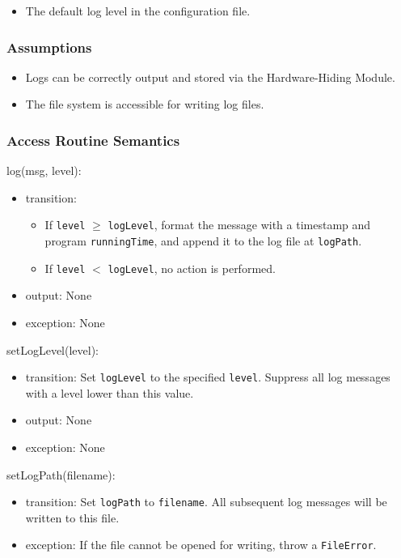 \documentclass[12pt, titlepage]{article}
\begin{document}
\begin{itemize}
\item The default log level in the configuration file.
\end{itemize}

\subsubsection{Assumptions}

\begin{itemize}
\item Logs can be correctly output and stored via the Hardware-Hiding Module.
\item The file system is accessible for writing log files.
\end{itemize}

\subsubsection{Access Routine Semantics}

\noindent log(msg, level):
\begin{itemize}
\item transition:
    \begin{itemize}
    \item If \texttt{level} $\geq$ \texttt{logLevel}, format the message with a
    timestamp and program \texttt{runningTime}, and append it to the log file at
    \texttt{logPath}.
    \item If \texttt{level} $<$ \texttt{logLevel}, no action is performed.
    \end{itemize}
\item output: None
\item exception: None
\end{itemize}

\noindent setLogLevel(level):
\begin{itemize}
\item transition: Set \texttt{logLevel} to the specified \texttt{level}.
Suppress all log messages with a level lower than this value.
\item output: None
\item exception: None
\end{itemize}

\noindent setLogPath(filename):
\begin{itemize}
\item transition: Set \texttt{logPath} to \texttt{filename}. All subsequent log
messages will be written to this file.
\item exception: If the file cannot be opened for writing, throw a
\texttt{FileError}.
\end{itemize}
\end{document}
